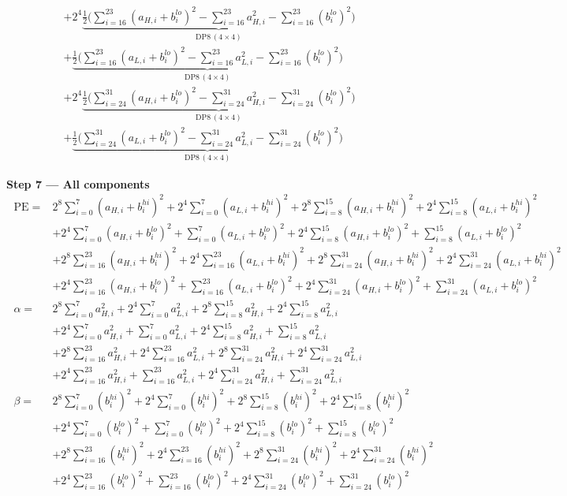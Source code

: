 \documentclass[fleqn]{article}
\newcommand{\DPop}[3]{\mathrm{DP#1}\,(#2\!\times\!#3)}
\begin{document}
\begin{align*}
  & + 2^{4}\underbrace{\tfrac{1}{2}\Big(\sum_{i=16}^{23}(a_{H,i}{+}b_i^{lo})^2 - \sum_{i=16}^{23}a_{H,i}^2 - \sum_{i=16}^{23}(b_i^{lo})^2\Big)}_{\DPop{8}{4}{4}} \\[0.5em]
  & + \underbrace{\tfrac{1}{2}\Big(\sum_{i=16}^{23}(a_{L,i}{+}b_i^{lo})^2 - \sum_{i=16}^{23}a_{L,i}^2 - \sum_{i=16}^{23}(b_i^{lo})^2\Big)}_{\DPop{8}{4}{4}} \\[0.5em]
  & + 2^{4}\underbrace{\tfrac{1}{2}\Big(\sum_{i=24}^{31}(a_{H,i}{+}b_i^{lo})^2 - \sum_{i=24}^{31}a_{H,i}^2 - \sum_{i=24}^{31}(b_i^{lo})^2\Big)}_{\DPop{8}{4}{4}} \\[0.5em]
  & + \underbrace{\tfrac{1}{2}\Big(\sum_{i=24}^{31}(a_{L,i}{+}b_i^{lo})^2 - \sum_{i=24}^{31}a_{L,i}^2 - \sum_{i=24}^{31}(b_i^{lo})^2\Big)}_{\DPop{8}{4}{4}}
\end{align*}

\textbf{Step 7 --- All components}
\[
\boxed{\;
\begin{aligned}
\mathrm{PE} ={}& 2^{8}\sum_{i=0}^{7}(a_{H,i}{+}b_i^{hi})^2 + 2^{4}\sum_{i=0}^{7}(a_{L,i}{+}b_i^{hi})^2 + 2^{8}\sum_{i=8}^{15}(a_{H,i}{+}b_i^{hi})^2 + 2^{4}\sum_{i=8}^{15}(a_{L,i}{+}b_i^{hi})^2 \\
  & + 2^{4}\sum_{i=0}^{7}(a_{H,i}{+}b_i^{lo})^2 + \sum_{i=0}^{7}(a_{L,i}{+}b_i^{lo})^2 + 2^{4}\sum_{i=8}^{15}(a_{H,i}{+}b_i^{lo})^2 + \sum_{i=8}^{15}(a_{L,i}{+}b_i^{lo})^2 \\
  & + 2^{8}\sum_{i=16}^{23}(a_{H,i}{+}b_i^{hi})^2 + 2^{4}\sum_{i=16}^{23}(a_{L,i}{+}b_i^{hi})^2 + 2^{8}\sum_{i=24}^{31}(a_{H,i}{+}b_i^{hi})^2 + 2^{4}\sum_{i=24}^{31}(a_{L,i}{+}b_i^{hi})^2 \\
  & + 2^{4}\sum_{i=16}^{23}(a_{H,i}{+}b_i^{lo})^2 + \sum_{i=16}^{23}(a_{L,i}{+}b_i^{lo})^2 + 2^{4}\sum_{i=24}^{31}(a_{H,i}{+}b_i^{lo})^2 + \sum_{i=24}^{31}(a_{L,i}{+}b_i^{lo})^2 \\[0.6em]
\alpha ={}& 2^{8}\sum_{i=0}^{7}a_{H,i}^2 + 2^{4}\sum_{i=0}^{7}a_{L,i}^2 + 2^{8}\sum_{i=8}^{15}a_{H,i}^2 + 2^{4}\sum_{i=8}^{15}a_{L,i}^2 \\
  & + 2^{4}\sum_{i=0}^{7}a_{H,i}^2 + \sum_{i=0}^{7}a_{L,i}^2 + 2^{4}\sum_{i=8}^{15}a_{H,i}^2 + \sum_{i=8}^{15}a_{L,i}^2 \\
  & + 2^{8}\sum_{i=16}^{23}a_{H,i}^2 + 2^{4}\sum_{i=16}^{23}a_{L,i}^2 + 2^{8}\sum_{i=24}^{31}a_{H,i}^2 + 2^{4}\sum_{i=24}^{31}a_{L,i}^2 \\
  & + 2^{4}\sum_{i=16}^{23}a_{H,i}^2 + \sum_{i=16}^{23}a_{L,i}^2 + 2^{4}\sum_{i=24}^{31}a_{H,i}^2 + \sum_{i=24}^{31}a_{L,i}^2 \\[0.6em]
\beta ={}& 2^{8}\sum_{i=0}^{7}(b_i^{hi})^2 + 2^{4}\sum_{i=0}^{7}(b_i^{hi})^2 + 2^{8}\sum_{i=8}^{15}(b_i^{hi})^2 + 2^{4}\sum_{i=8}^{15}(b_i^{hi})^2 \\
  & + 2^{4}\sum_{i=0}^{7}(b_i^{lo})^2 + \sum_{i=0}^{7}(b_i^{lo})^2 + 2^{4}\sum_{i=8}^{15}(b_i^{lo})^2 + \sum_{i=8}^{15}(b_i^{lo})^2 \\
  & + 2^{8}\sum_{i=16}^{23}(b_i^{hi})^2 + 2^{4}\sum_{i=16}^{23}(b_i^{hi})^2 + 2^{8}\sum_{i=24}^{31}(b_i^{hi})^2 + 2^{4}\sum_{i=24}^{31}(b_i^{hi})^2 \\
  & + 2^{4}\sum_{i=16}^{23}(b_i^{lo})^2 + \sum_{i=16}^{23}(b_i^{lo})^2 + 2^{4}\sum_{i=24}^{31}(b_i^{lo})^2 + \sum_{i=24}^{31}(b_i^{lo})^2
\end{aligned}
\;}
\]
\end{document}
